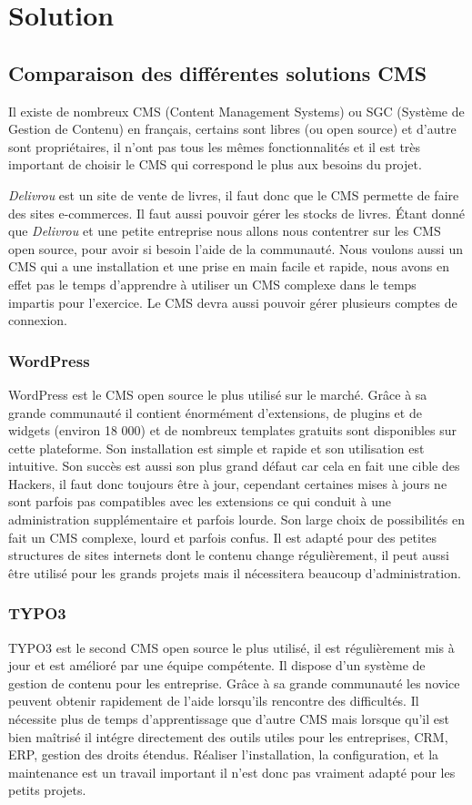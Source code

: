\documentclass[a4paper,12pt]{report}
\begin{document}
\part{Solution}
\chapter{Comparaison des différentes solutions CMS}
Il existe de nombreux CMS (Content Management Systems) ou SGC (Système
de Gestion de Contenu) en français, certains sont libres (ou open source)
et d'autre sont propriétaires, il n'ont pas tous les mêmes fonctionnalités
et il est très important de choisir le CMS qui correspond le plus aux
besoins du projet.

\textit{Delivrou} est un site de vente de livres, il faut donc que le
CMS permette de faire des sites e-commerces. Il faut aussi pouvoir
gérer les stocks de livres. Étant donné que \textit{Delivrou} et une
petite entreprise nous allons nous contentrer sur les CMS open source,
pour avoir si besoin l'aide de la communauté. Nous voulons aussi un
CMS qui a une installation et une prise en main facile et rapide, nous
avons en effet pas le temps d'apprendre à utiliser un CMS complexe
dans le temps impartis pour l'exercice. Le CMS devra aussi pouvoir
gérer plusieurs comptes de connexion.

\section{WordPress}
WordPress est le CMS open source le plus utilisé sur le marché. Grâce
à sa grande communauté il contient énormément d’extensions, de plugins
et de widgets (environ 18 000) et de nombreux templates gratuits sont
disponibles sur cette plateforme. Son installation est simple et
rapide et son utilisation est intuitive.  Son succès est aussi son
plus grand défaut car cela en fait une cible des Hackers, il faut donc
toujours être à jour, cependant certaines mises à jours ne sont
parfois pas compatibles avec les extensions ce qui conduit à une
administration supplémentaire et parfois lourde. Son large choix de
possibilités en fait un CMS complexe, lourd et parfois confus.  Il est
adapté pour des petites structures de sites internets dont le contenu
change régulièrement, il peut aussi être utilisé pour les grands
projets mais il nécessitera beaucoup d'administration.

\section{TYPO3}
TYPO3 est le second CMS open source le plus utilisé, il est
régulièrement mis à jour et est amélioré par une équipe compétente. Il
dispose d'un système de gestion de contenu pour les entreprise.  Grâce
à sa grande communauté les novice peuvent obtenir rapidement de l'aide
lorsqu'ils rencontre des difficultés.  Il nécessite plus de temps
d'apprentissage que d'autre CMS mais lorsque qu'il est bien maîtrisé
il intégre directement des outils utiles pour les entreprises, CRM,
ERP, gestion des droits étendus.  Réaliser l’installation, la
configuration, et la maintenance est un travail important il n'est
donc pas vraiment adapté pour les petits projets.
\end{document}

